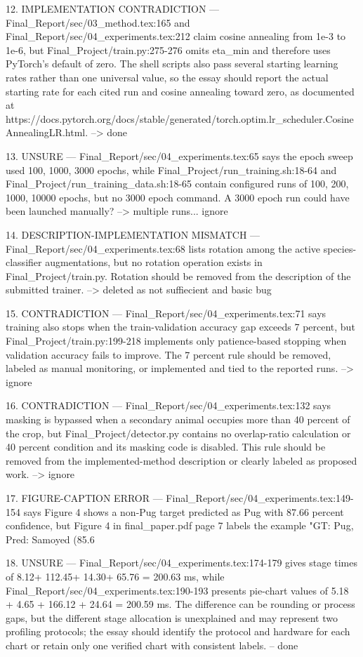 12. IMPLEMENTATION CONTRADICTION — Final_Report/sec/03_method.tex:165 and Final_Report/sec/04_experiments.tex:212 claim cosine annealing from 1e-3 to 1e-6, but Final_Project/train.py:275-276 omits eta_min and therefore uses PyTorch's default of zero. The shell scripts also pass several starting learning rates rather than one universal value, so the essay should report the actual starting rate for each cited run and cosine annealing toward zero, as documented at https://docs.pytorch.org/docs/stable/generated/torch.optim.lr_scheduler.CosineAnnealingLR.html.
--> done

13. UNSURE — Final_Report/sec/04_experiments.tex:65 says the epoch sweep used 100, 1000, 3000 epochs, while Final_Project/run_training.sh:18-64 and Final_Project/run_training_data.sh:18-65 contain configured runs of 100, 200, 1000, 10000 epochs, but no 3000 epoch command. A 3000 epoch run could have been launched manually? 
--> multiple runs... ignore

14. DESCRIPTION-IMPLEMENTATION MISMATCH — Final_Report/sec/04_experiments.tex:68 lists rotation among the active species-classifier augmentations, but no rotation operation exists in Final_Project/train.py. Rotation should be removed from the description of the submitted trainer.
--> deleted as not suffiecient and basic bug

15. CONTRADICTION — Final_Report/sec/04_experiments.tex:71 says training also stops when the train-validation accuracy gap exceeds 7 percent, but Final_Project/train.py:199-218 implements only patience-based stopping when validation accuracy fails to improve. The 7 percent rule should be removed, labeled as manual monitoring, or implemented and tied to the reported runs.
--> ignore

16. CONTRADICTION — Final_Report/sec/04_experiments.tex:132 says masking is bypassed when a secondary animal occupies more than 40 percent of the crop, but Final_Project/detector.py contains no overlap-ratio calculation or 40 percent condition and its masking code is disabled. This rule should be removed from the implemented-method description or clearly labeled as proposed work.
--> ignore

17. FIGURE-CAPTION ERROR — Final_Report/sec/04_experiments.tex:149-154 says Figure 4 shows a non-Pug target predicted as Pug with 87.66 percent confidence, but Figure 4 in final_paper.pdf page 7 labels the example "GT: Pug, Pred: Samoyed (85.6%

18. UNSURE — Final_Report/sec/04_experiments.tex:174-179 gives stage times of 8.12+ 112.45+ 14.30+ 65.76 = 200.63 ms, while Final_Report/sec/04_experiments.tex:190-193 presents pie-chart values of 5.18 + 4.65 + 166.12 + 24.64 = 200.59 ms. The difference can be rounding or process gaps, but the different stage allocation is unexplained and may represent two profiling protocols; the essay should identify the protocol and hardware for each chart or retain only one verified chart with consistent labels.
-- done

